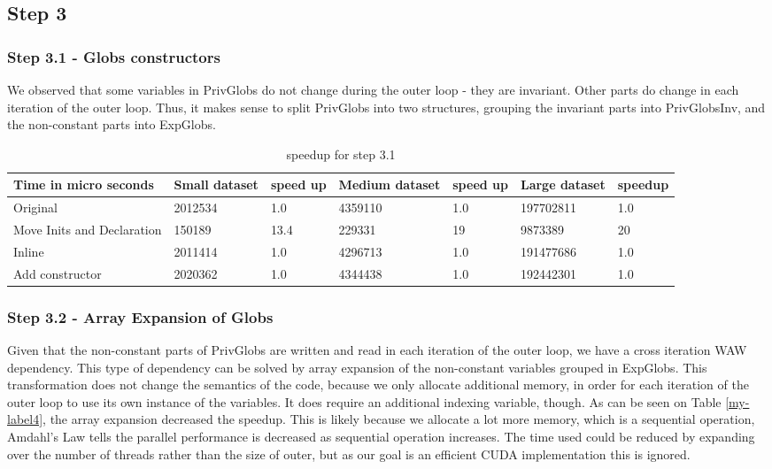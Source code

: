 \documentclass{article}
\begin{document}
\subsection*{Step 3}

\subsubsection*{Step 3.1 - Globs constructors}
We observed that some variables in PrivGlobs do not change during the outer loop - they are invariant. Other parts do change in each iteration of the outer loop. Thus, it makes sense to split PrivGlobs into two structures, grouping the invariant parts into PrivGlobsInv, and the non-constant parts into ExpGlobs.
\begin{table}[ht]
\centering
\caption{speedup for step 3.1}
\label{my-label3}
\begin{tabular}{|l|l|l|l|l|l|l|}
\hline
Time in micro seconds& Small dataset & speed up & Medium dataset & speed up & Large dataset & speedup \\ \hline
Original         & 2012534       &  1.0        & 4359110        &  1.0        & 197702811     &  1.0       \\ \hline
Move Inits 
and Declaration  & 150189        &  13.4       & 229331         &  19         & 9873389       &  20        \\ \hline
Inline           & 2011414       &  1.0        & 4296713        &  1.0        & 191477686     &  1.0       \\ \hline
Add constructor  & 2020362       &  1.0        & 4344438        &  1.0        & 192442301     &  1.0       \\ \hline
\end{tabular}
\end{table}
\subsubsection*{Step 3.2 - Array Expansion of Globs}
Given that the non-constant parts of PrivGlobs are written and read in each iteration of the outer loop, we have a cross iteration WAW dependency. This type of dependency can be solved by array expansion of the non-constant variables grouped in ExpGlobs.
This transformation does not change the semantics of the code, because we only allocate additional memory, in order for each iteration of the outer loop to use its own instance of the variables. It does require an additional indexing variable, though.
As can be seen on Table \ref{my-label4}, the array expansion decreased the speedup. This is likely because we allocate a lot more memory, which is
a sequential operation, Amdahl's Law tells the parallel performance is decreased as sequential operation increases. The time used could be reduced by expanding over the number of threads rather than the size of outer, but as our goal is an efficient CUDA implementation this is ignored.
\end{document}
